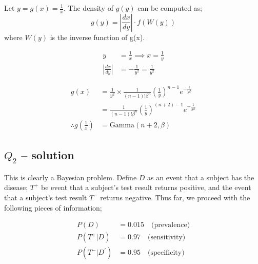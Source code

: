 \documentclass[12pt,a4paper, fleq]{article}
\begin{document}
\begin{itemize}
 Let $y = g(x) = \frac1x$. The density of $g(y)$ can be computed as;
$$g(y) = \left \lvert \frac{dx}{dy} \right \rvert \cdot f(W(y))$$ where $W(y)$ is the inverse function of  g(x).

\begin{equation*}
\begin{split}
y & = \frac1x \implies x  = \frac1y\\
\left \lvert \frac{dx}{dy} \right \rvert & = -\frac{1}{y^2} = \frac{1}{y^2}
\end{split}
\end{equation*}

\begin{equation*}
\begin{split}
g(x) &= \frac{1}{y^2} \times \frac{1}{(n-1)!\beta^n} \left(\frac{1}{y}\right)^{n-1}e^{-\frac{1}{y\beta}}\\
 & =  \frac{1}{(n-1)!\beta^n} \left(\frac{1}{y}\right)^{(n+2) - 1}e^{-\frac{1}{y\beta}}\\
\therefore g\left(\frac1x\right) & =  \mbox{Gamma}(n+2, \beta)
\end{split}
\end{equation*}

\end{itemize}



\subsection*{$Q_{2}$ -- solution}
This is clearly a Bayesian problem. Define $D$ as an event that a subject has the disease; $T^+$ be event that a subject's test result returns positive, and the event that a subject's test result $T^-$ returns negative. Thus far, we proceed with the following pieces of information;

\begin{equation*}
\begin{split}
P(D) &= 0.015 \quad \mbox{(prevalence)}\\
P(T^+\vert D) &= 0.97 \quad \mbox{(sensitivity)}\\
P(T^-\vert D^\prime) &= 0.95 \quad \mbox{(specificity)}
\end{split}
\end{equation*}
\end{document}
